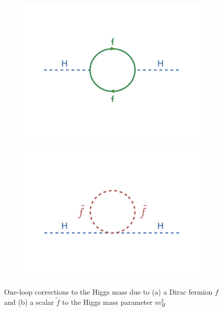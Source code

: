 \begin{figure}[h!]
	\begin{center}
	 \begin{subfigure}[b]{0.40\textwidth}
		\includegraphics[width=\textwidth]{figures/theory/loopf.png}
		 \caption{ }
		 \label{fig:SM:Loopf}
    \end{subfigure}
    \begin{subfigure}[b]{0.40\textwidth}
	    	\includegraphics[width=\textwidth]{figures/theory/loopS.png}
                \caption{ }
		\label{fig:SM:Loopftilde}
    \end{subfigure}
    		\caption{One-loop corrections to the Higgs mass due to (a) a Dirac fermion $f$ and (b) a scalar $\tilde{f}$ to the Higgs mass parameter $m_H^2$}
		\label{fig:SM:Loop}
	\end{center}
\end{figure}

